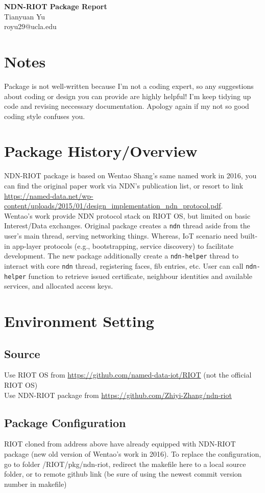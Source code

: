 \documentclass[a4paper, 11pt]{article}
\begin{document}
    \noindent
    \large\textbf{NDN-RIOT Package Report} \\
    \normalsize Tianyuan Yu \\ royu29@ucla.edu
    
    \section{Notes}
    Package is not well-written because I'm not a coding expert, so any suggestions about coding or design you can provide are highly helpful! I'm keep tidying up code and revising neccessary documentation. Apology again if my not so good coding style confuses you.
    
    \section{Package History/Overview}
    NDN-RIOT package is based on Wentao Shang's same named work in 2016, you can find the original paper work via NDN's publication list, or resort to link \url{https://named-data.net/wp-content/uploads/2015/01/design_implementation_ndn_protocol.pdf}.\\ Wentao's work provide NDN protocol stack on RIOT OS, but limited on basic Interest/Data exchanges. Original package creates a \texttt{ndn} thread aside from the user's main thread, serving networking things. Whereas, IoT scenario need built-in app-layer protocols (e.g., bootstrapping, service discovery) to facilitate development. The new package additionally create a \texttt{ndn-helper} thread to interact with core \texttt{ndn} thread, registering faces, fib entries, etc. User can call \texttt{ndn-helper} function to retrieve issued certificate, neighbour identities and available services, and allocated access keys.
    
    \section{Environment Setting}
    \subsection{Source}
    Use RIOT OS from \url{https://github.com/named-data-iot/RIOT} (not the official RIOT OS)\\
    Use NDN-RIOT package from \url{https://github.com/Zhiyi-Zhang/ndn-riot}
    \subsection{Package Configuration}
    RIOT cloned from address above have already equipped with NDN-RIOT package (new old version of Wentao's work in 2016). To replace the configuration, go to folder /RIOT/pkg/ndn-riot, redirect the makefile here to a local source folder, or to remote github link (be sure of using the newest commit version number in makefile) 
\end{document}
